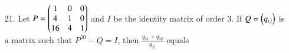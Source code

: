\documentclass[journal,12pt,onecolumn]{IEEEtran}
\theoremstyle{remark}
\begin{document}
\begin{enumerate}
		\item[21.] Let $P=\begin{pmatrix}1&0&0\\4&1&0\\16&4&1\end{pmatrix}$ and $I$ be the identity matrix of order 3. If $Q = \begin{pmatrix}q_{ij}\end{pmatrix}$ is a matrix such that $P^{50} -Q =I$, then $\frac{q_{31}+q_{32}}{q_{21}}$ equals
	\hfill{}
			\begin{enumerate}
					
			\end{enumerate}
\end{enumerate}
\end{document}
